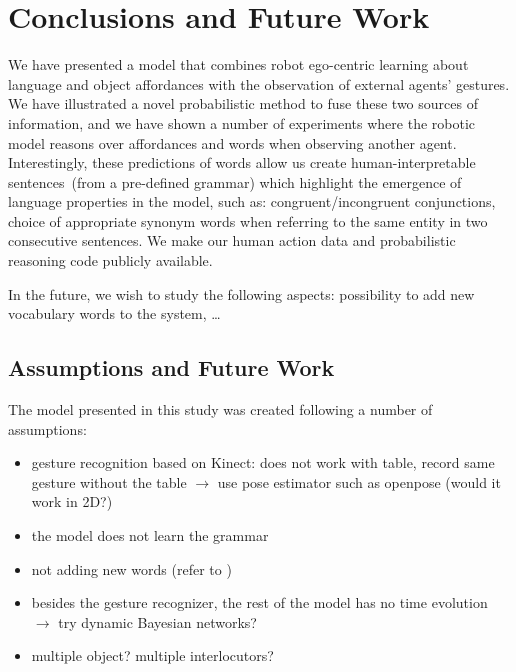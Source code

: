 
\section{Conclusions and Future Work}
\label{sec:conclusions}

We have presented a model that combines robot ego-centric learning about language and object affordances with the observation of external agents' gestures.
We have illustrated a novel probabilistic method to fuse these two sources of information, and we have shown a number of experiments where the robotic model reasons over affordances and words when observing another agent.
Interestingly, these predictions of words allow us create human-interpretable sentences~(from a pre-defined grammar) which highlight the emergence of language properties in the model, such as:
congruent/incongruent conjunctions,
choice of appropriate synonym words when referring to the same entity in two consecutive sentences.
We make our human action data and probabilistic reasoning code publicly available.


In the future, we wish to study the following aspects:
possibility to add new vocabulary words to the system,
\dots

\subsection{Assumptions and Future Work}
The model presented in this study was created following a number of assumptions:
\begin{itemize}
\item gesture recognition based on Kinect: does not work with table, record same gesture without the table $\rightarrow$ use pose estimator such as openpose (would it work in 2D?)
\item the model does not learn the grammar
\item not adding new words (refer to )
\item besides the gesture recognizer, the rest of the model has no time evolution $\rightarrow$ try dynamic Bayesian networks?
\item multiple object? multiple interlocutors?
\end{itemize}

